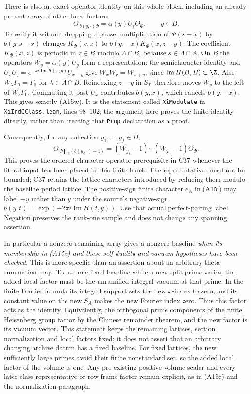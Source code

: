 \documentclass[11pt]{article}
\theoremstyle{definition}\newtheorem{definition}[theorem]{Definition}\newtheorem{remark}[theorem]{Remark}
\begin{document}
There is also an exact operator identity on this whole block,
including an already present array of other local factors:
\[
       \Theta_{\,b(y,\cdot)\Phi}
                =\alpha(y)U_y\Theta_\Phi,
                  \qquad y\in B.
 \tag{A15w}
\]
To verify it without dropping a phase, multiplication of $\Phi(s-x)$
by $b(y,s-x)$ changes $K_\Phi(x,z)$ to
$b(y,-x)K_\Phi(x,z-y)$.
The coefficient $K_\Phi(x,z)$ is periodic in
$z\in B$ modulo $\Lambda\cap B$, because $s\in\Lambda\cap A$.
On $B$ the operators $W_y=\alpha(y)U_y$ form a representation:
the semicharacter identity and
$U_xU_y=e^{-\pi i\operatorname{Im}H(x,y)}U_{x+y}$ give
$W_xW_y=W_{x+y}$, since $\operatorname{Im}H(B,B)\subset\Z$.
Also $W_\lambda F_0=F_0$ for $\lambda\in\Lambda\cap B$.
Reindexing $z-y$ in $S_B$ therefore moves $W_y$ to the left of
$W_zF_0$.  Commuting it past $U_x$ contributes $b(y,x)$,
which cancels $b(y,-x)$.  This gives exactly (A15w).
It is the statement called \texttt{XiModulate} in
\texttt{XiIndCClass.lean}, lines 98--102; the argument here proves
the finite identity directly, rather than treating that
\texttt{Prop} declaration as a proof.

Consequently, for any collection $y_1,\ldots,y_f\in B$,
\[
 \Theta_{\,\Phi\prod_i(b(y_i,\cdot)-1)}
      =(W_{y_f}-1)\cdots(W_{y_1}-1)\Theta_\Phi.
 \tag{A15x}
\]
This proves the ordered character-operator prerequisite in C37
whenever the literal input has been placed in this finite block.
The representatives need not be bounded; C37 retains the lattice
characters introduced by reducing them modulo the baseline period
lattice.  The positive-sign finite character $e_A$ in (A15i) may
label $-y$ rather than $y$ under the source's negative-sign
$b(y,t)=\exp(-2\pi i\operatorname{Im}H(t,y))$.
Use that actual perfect-pairing label.  Negation preserves the
rank-one sample and does not change any spanning assertion.

In particular a nonzero remaining array gives a nonzero baseline
\emph{when its membership in (A15v) and these self-duality and
vacuum hypotheses have been checked}.  This is more specific than
an assertion about an arbitrary theta summation map.  To use one
fixed baseline while a new split prime varies, the added local
factor must be the unramified integral vacuum at that prime.
In the finite Fourier formula its integral support sets the new
$x$-index to zero, and its constant value on the new $S_A$ makes
the new Fourier index zero.  Thus this factor acts as the identity.
Equivalently, the orthogonal prime components of the finite
Heisenberg group factor by the Chinese remainder theorem, and
the new factor is its vacuum vector.  This statement keeps the
remaining lattices, section normalization and local factors fixed;
it does not assert that an arbitrary changing archive datum has a
fixed baseline.  For fixed lattices, the new sufficiently large
primes avoid their finite nonstandard set, so the added local
factor of the volume is one.  Any pre-existing positive volume
scalar and every later class-representative or row-frame factor
remain explicit, as in (A15e) and the normalization paragraph.
\end{document}
